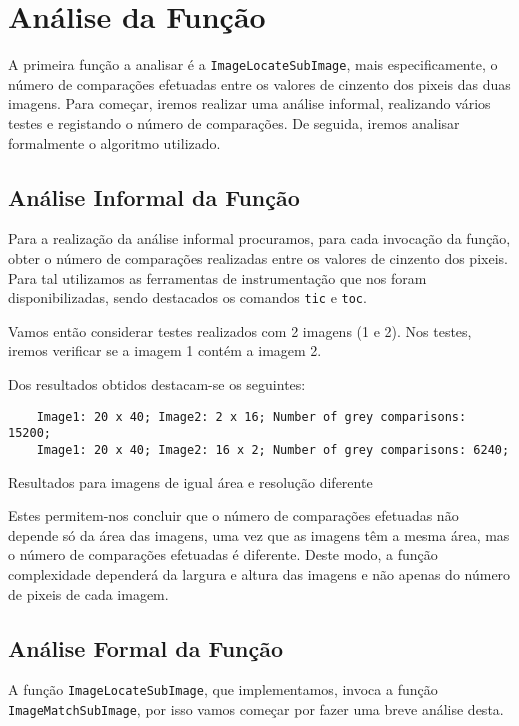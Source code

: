 \renewcommand{\listingscaption}{Caso em estudo:}

\chapter{Análise da Função }

A primeira função a analisar é a \Verb|ImageLocateSubImage|, mais
especificamente, o número de comparações efetuadas entre os valores de
cinzento dos pixeis das duas imagens. Para começar, iremos realizar uma análise
informal, realizando vários testes e registando o número de comparações.
De seguida, iremos analisar formalmente o algoritmo utilizado.

\section{Análise Informal da Função }

Para a realização da análise informal procuramos, para cada invocação
da função, obter o número de comparações realizadas entre os valores de
cinzento dos pixeis. Para tal utilizamos as ferramentas de instrumentação que
nos foram disponibilizadas, sendo destacados os comandos \Verb|tic| e \Verb|toc|.

Vamos então considerar testes realizados com 2 imagens (1 e 2). Nos testes,
iremos verificar se a imagem 1 contém a imagem 2.

Dos resultados obtidos destacam-se os seguintes:

\begin{listing}[H]
	\centering
	\begin{verbatim}
	Image1: 20 x 40; Image2: 2 x 16; Number of grey comparisons: 15200;
	Image1: 20 x 40; Image2: 16 x 2; Number of grey comparisons: 6240;
  \end{verbatim}
	\caption{Resultados para imagens de igual área e resolução diferente}
\end{listing}

Estes permitem-nos concluir que o número de comparações efetuadas não depende só
da área das imagens, uma vez que as imagens têm a mesma área, mas o número de
comparações efetuadas é diferente. Deste modo, a função complexidade dependerá
da largura e altura das imagens e não apenas do número de pixeis de cada imagem.

\section{Análise Formal da Função }
\renewcommand{\listingscaption}{Código:}
A função \Verb|ImageLocateSubImage|, que implementamos, invoca a função
\Verb|ImageMatchSubImage|, por isso vamos começar por fazer uma breve análise
desta.

